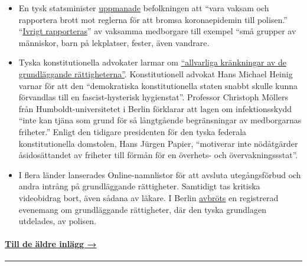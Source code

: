 \begin{itemize}
\tightlist
\item
  En tysk statsminister
  \href{https://de.nachrichten.yahoo.com/strobl-b\%C3\%BCrger-verst\%C3\%B6\%C3\%9Fe-gegen-corona-regeln-polizei-melden-095746341.html}{uppmanade}
  befolkningen att ``vara vaksam och rapportera brott mot reglerna för
  att bromsa koronaepidemin till polisen.''
  ``\href{https://www.br.de/nachrichten/bayern/buerger-melden-eifrig-verstoesse-gegen-corona-regeln,RuGXp1h}{Ivrigt
  rapporteras}'' av vaksamma medborgare till exempel ``små grupper av
  människor, barn på lekplatser, fester, även vandrare.
\item
  Tyska konstitutionella advokater larmar om
  \href{https://www.focus.de/politik/deutschland/corona-regelungen-der-regierung-medizin-darf-nicht-gefaehrlicher-sein-als-die-krankheit_id_11827625.html}{``allvarliga
  kränkningar av de grundläggande rättigheterna''}. Konstitutionell
  advokat Hans Michael Heinig varnar för att den ``demokratiska
  konstitutionella staten snabbt skulle kunna förvandlas till en
  fascist-hysterisk hygienstat''. Professor Christoph Möllers från
  Humboldt-universitetet i Berlin förklarar att lagen om infektionsskydd
  ``inte kan tjäna som grund för så långtgående begränsningar av
  medborgarnas friheter.'' Enligt den tidigare presidenten för den tyska
  federala konstitutionella domstolen, Hans Jürgen Papier, ``motiverar
  inte nödåtgärder åsidosättandet av friheter till förmån för en
  överhets- och övervakningssstat''.
\item
  I flera länder lanserades Online-namnlistor för att avsluta
  utegångsförbud och andra intrång på grundläggande rättigheter.
  Samtidigt tas kritiska videobidrag bort, även sådana av läkare. I
  Berlin
  \href{https://www.heise.de/tp/features/Wenn-Demonstranten-zu-Gefaehrdern-erklaert-werden-4692869.html}{avbröts}
  en registrerad evenemang om grundläggande rättigheter, där den tyska
  grundlagen utdelades, av polisen.
\end{itemize}

\hypertarget{till-de-uxe4ldre-inluxe4gg-}{%
\paragraph{\texorpdfstring{\href{https://swprs.org/fakta-om-covid-19-arkiv/}{Till
de äldre inlägg
→}}{Till de äldre inlägg →}}\label{till-de-uxe4ldre-inluxe4gg-}}

\begin{center}\rule{0.5\linewidth}{\linethickness}\end{center}

